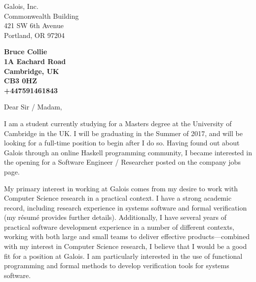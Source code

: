 \documentclass[11pt]{letter} %
\begin{document}

\begin{letter}{ Galois, Inc. \\
Commonwealth Building \\
421 SW 6th Avenue \\
Portland, OR 97204} 


\begin{center}
\large\bf Bruce Collie \\ %
1A Eachard Road \\ Cambridge, UK \\ CB3 0HZ \\ +447591461843
\end{center} 
\vfill

\signature{Bruce Collie} %


\opening{Dear Sir / Madam,} 

I am a student currently studying for a Masters degree at the University of
Cambridge in the UK. I will be graduating in the Summer of 2017, and will be
looking for a full-time position to begin after I do so. Having found out about
Galois through an online Haskell programming community, I became interested in
the opening for a Software Engineer / Researcher posted on the company jobs
page.

My primary interest in working at Galois comes from my desire to work with
Computer Science research in a practical context. I have a strong academic
record, including research experience in systems software and formal
verification (my r\'esum\'e provides further details). Additionally, I have
several years of practical software development experience in a number of
different contexts, working with both large and small teams to deliver effective
products---combined with my interest in Computer Science research, I believe
that I would be a good fit for a position at Galois. I am particularly
interested in the use of functional programming and formal methods to develop
verification tools for systems software.
 

\end{letter}
\end{document}
